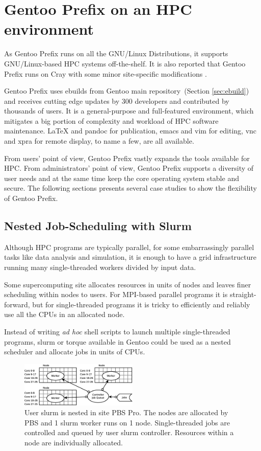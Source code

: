 \documentclass[a4paper,conference]{IEEEtran}
\begin{document}

\section{Gentoo Prefix on an HPC environment}
As Gentoo Prefix runs on all the GNU/Linux Distributions, it supports
GNU/Linux-based HPC systems off-the-shelf.  It is also reported that
Gentoo Prefix runs on Cray with some minor site-specific modifications
\cite{cray}.

Gentoo Prefix uses ebuilds from Gentoo main repository~(Section
\ref{sec:ebuild}) and receives cutting edge updates by 300 developers
and contributed by thousands of users.  It is a general-purpose and
full-featured environment, which mitigates a big portion of complexity
and workload of HPC software maintenance. \LaTeX{} and pandoc for
publication, emacs and vim for editing, vnc and xpra for remote
display, to name a few, are all available.

From users' point of view, Gentoo Prefix vastly expands the tools
available for HPC.  From administrators' point of view, Gentoo Prefix
supports a diversity of user needs and at the same time keep the core
operating system stable and secure. The following sections presents
several case studies to show the flexibility of Gentoo Prefix.

\subsection{Nested Job-Scheduling with Slurm}
\label{sec:slurm}
Although HPC programs are typically parallel, for some embarrassingly
parallel tasks like data analysis and simulation, it is enough to have
a grid infrastructure running many single-threaded workers divided by
input data.

Some supercomputing site allocates resources in units of nodes and
leaves finer scheduling within nodes to users.  For MPI-based parallel
programs it is straight-forward, but for single-threaded programs it
is tricky to efficiently and reliably use all the CPUs in an allocated
node.

Instead of writing \textit{ad hoc} shell scripts to launch multiple
single-threaded programs, slurm or torque available in Gentoo could be
used as a nested scheduler and allocate jobs in units of
CPUs.

\begin{figure}[htb]
  \centering
  \includegraphics[width=0.5\textwidth]{node-slurm.eps}
  \caption{User slurm is nested in site PBS Pro.  The nodes are
    allocated by PBS and 1 slurm worker runs on 1 node.
    Single-threaded jobs are controlled and queued by user slurm
    controller.  Resources within a node are individually allocated.}
  \label{fig:slurm}
\end{figure}
\end{document}
